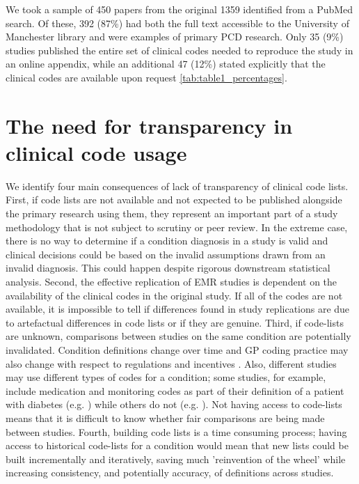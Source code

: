 \documentclass[10pt]{article}
\begin{document}
We took a sample of 450 papers from the original 1359 identified from a PubMed search.  Of these, 392 (87\%) had both  the full text accessible to the University of Manchester library and were examples of primary PCD research.  Only 35 (9\%) studies published the entire set of clinical codes needed to reproduce the study in an online appendix, while an additional 47 (12\%) stated explicitly that the clinical codes are available upon request \ref{tab:table1_percentages}.


\section*{The need for transparency in clinical code usage}


We identify four main consequences of lack of transparency of clinical code lists.  First, if code lists are not available and not expected to be published alongside the primary research using them, they represent an important part of a study methodology that is not subject to scrutiny or peer review. In the extreme case, there is no way to determine if a condition diagnosis in a study is valid and clinical decisions could be based on the invalid assumptions drawn from an invalid diagnosis.  This could happen despite rigorous downstream statistical analysis.  Second, the effective replication of EMR studies is dependent on the availability of the clinical codes in the original study.  If all of the codes are not available, it is impossible to tell if differences found in study replications are due to artefactual differences in code lists or if they are genuine.  Third, if code-lists are unknown, comparisons between studies on the same condition are potentially invalidated.  Condition definitions change over time and GP coding practice may also change with respect to regulations and incentives \cite{Calvert2009}. Also, different studies may use different types of codes for a condition; some studies, for example, include medication and monitoring codes as part of their definition of a patient with diabetes (e.g. \cite{Mulnier2006}) while others do not (e.g. \cite{Kontopantelis2014}).  Not having access to code-lists means that it is difficult to know whether fair comparisons are being made between studies. Fourth, building code lists is a time consuming process; having access to historical code-lists  for a condition would mean that new lists could be built incrementally and iteratively, saving much 'reinvention of the wheel' while increasing consistency, and potentially accuracy, of definitions across studies.
\end{document}
